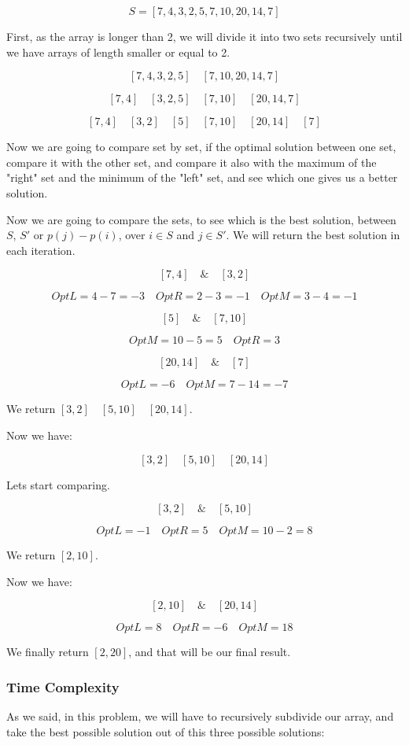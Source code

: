 \documentclass{article}
\begin{document}
$$S = [7,4,3,2,5,7,10,20,14,7]$$

First, as the array is longer than 2, we will divide it into two sets recursively until we have arrays of length smaller or equal to 2.

$$[7,4,3,2,5] \quad [7,10,20,14,7]$$

$$[7,4] \quad [3,2,5] \quad [7,10] \quad [20,14,7]$$

$$[7,4] \quad [3,2] \quad [5] \quad [7,10] \quad [20,14] \quad [7]$$

Now we are going to compare set by set, if the optimal solution between one set, compare it with the other set, and compare it also with the maximum of the "right" set and the minimum of the "left" set, and see which one gives us a better solution.

Now we are going to compare the sets, to see which is the best solution, between $S$, $S'$ or $p(j)-p(i)$, over $i \in S$ and $j \in S'$. We will return the best solution in each iteration.

$$[7,4] \quad \& \quad [3,2]$$

$$OptL = 4-7 = -3 \quad OptR = 2-3 = -1 \quad OptM = 3-4 = -1$$

$$[5] \quad \& \quad [7,10]$$

$$OptM = 10-5 = 5 \quad OptR = 3$$

$$[20,14] \quad  \& \quad [7]$$

$$OptL = -6 \quad OptM = 7-14 = -7$$

We return $[3,2] \quad [5,10] \quad [20,14]$.

Now we have:

$$[3,2] \quad [5,10] \quad [20,14]$$

Lets start comparing.

$$[3,2] \quad \& \quad [5,10]$$

$$OptL = -1 \quad OptR = 5 \quad OptM = 10 - 2 = 8$$

We return $[2,10]$.

Now we have:

$$[2,10] \quad \& \quad [20,14]$$

$$OptL = 8 \quad OptR = -6 \quad OptM = 18$$

We finally return $[2,20]$, and that will be our final result.

\subsubsection*{Time Complexity}

As we said, in this problem, we will have to recursively subdivide our array, and take the best possible solution out of this three possible solutions:
\end{document}
